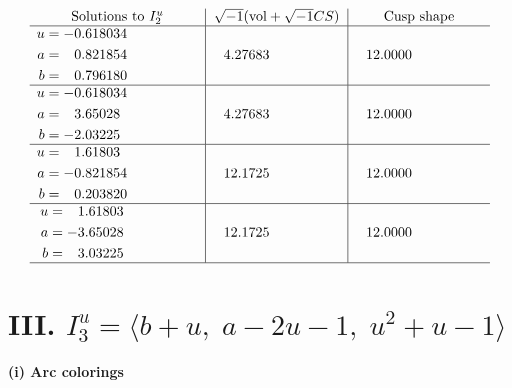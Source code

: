 \documentclass[1p]{elsarticle_modified}
\theoremstyle{definition}
\newcommand{\I}{\sqrt{-1}}
\begin{document}
$$\begin{array}{c|c|c}  
\text{Solutions to }I^u_{2}& \I (\text{vol} + \sqrt{-1}CS) & \text{Cusp shape}\\
 \hline 
\begin{aligned}
u &= -0.618034\phantom{ +0.000000I} \\
a &= \phantom{-}0.821854\phantom{ +0.000000I} \\
b &= \phantom{-}0.796180\phantom{ +0.000000I}\end{aligned}
 & \phantom{-}4.27683\phantom{ +0.000000I} & \phantom{-}12.0000\phantom{ +0.000000I} \\ \hline\begin{aligned}
u &= -0.618034\phantom{ +0.000000I} \\
a &= \phantom{-}3.65028\phantom{ +0.000000I} \\
b &= -2.03225\phantom{ +0.000000I}\end{aligned}
 & \phantom{-}4.27683\phantom{ +0.000000I} & \phantom{-}12.0000\phantom{ +0.000000I} \\ \hline\begin{aligned}
u &= \phantom{-}1.61803\phantom{ +0.000000I} \\
a &= -0.821854\phantom{ +0.000000I} \\
b &= \phantom{-}0.203820\phantom{ +0.000000I}\end{aligned}
 & \phantom{-}12.1725\phantom{ +0.000000I} & \phantom{-}12.0000\phantom{ +0.000000I} \\ \hline\begin{aligned}
u &= \phantom{-}1.61803\phantom{ +0.000000I} \\
a &= -3.65028\phantom{ +0.000000I} \\
b &= \phantom{-}3.03225\phantom{ +0.000000I}\end{aligned}
 & \phantom{-}12.1725\phantom{ +0.000000I} & \phantom{-}12.0000\phantom{ +0.000000I}\\
 \hline 
 \end{array}$$\newpage\newpage\renewcommand{\arraystretch}{1}
\centering \section*{III. $I^u_{3}= \langle b+u,\;a-2 u-1,\;u^2+u-1 \rangle$}
\flushleft \textbf{(i) Arc colorings}\\
\end{document}
